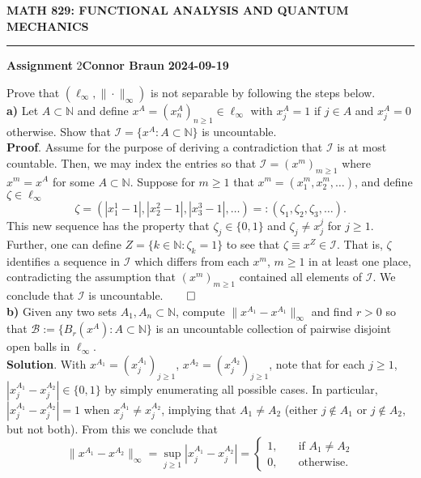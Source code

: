 \documentclass[10pt]{article}
\newcommand{\mbb}[1]{\mathbb{#1}}
\newcommand{\1}[1]{\mathbbm{1}_{#1}}
\newcommand{\mc}[1]{\mathcal{#1}}
\begin{document}
    \begin{center}
        {\bf\large{MATH 829: FUNCTIONAL ANALYSIS AND QUANTUM MECHANICS}}
        \smallskip
        \hrule
        \smallskip
        {\bf Assignment} 2\hfill {\bf Connor Braun} \hfill {\bf 2024-09-19}
    \end{center}
    \vspace{5pt}
     Prove that $(\ell_\infty,\|\cdot\|_\infty)$ is not separable by following the steps below.\\[5pt]
    {\bf a)} Let $A\subset\mbb{N}$ and define $x^A=(x^A_n)_{n\geq 1}\in\ell_\infty$ with $x^A_j=1$ if $j\in A$ and $x^A_j=0$ otherwise. Show that $\mc{I}=\{x^A:A\subset \mbb{N}\}$ is uncountable.\\[5pt]
    {\bf Proof}. Assume for the purpose of deriving a contradiction that $\mc{I}$ is at most countable. Then, we may index the entries so that $\mc{I}=(x^m)_{m\geq 1}$ where $x^m=x^A$ for some $A\subset\mbb{N}$.
    Suppose for $m\geq 1$ that $x^m=(x^m_1,x^m_2,\dots)$, and define $\zeta\in\ell_\infty$
    \[\zeta=(|x^1_1-1|,|x^2_2-1|,|x^3_3-1|,\dots)=:(\zeta_1,\zeta_2,\zeta_3,\dots).\]
    This new sequence has the property that $\zeta_j\in\{0,1\}$ and $\zeta_j\neq x^j_j$ for $j\geq 1$. Further, one can define $Z=\{k\in\mbb{N}:\zeta_k=1\}$
    to see that $\zeta\equiv x^Z\in\mc{I}$. That is, $\zeta$ identifies a sequence in $\mc{I}$ which differs from each $x^m$, $m\geq 1$ in at least one place, contradicting
    the assumption that $(x^m)_{m\geq 1}$ contained all elements of $\mc{I}$. We conclude that $\mc{I}$ is uncountable.\hfill{$\qed$}\\[5pt]
    {\bf b)} Given any two sets $A_1,A_n\subset\mbb{N}$, compute $\|x^{A_1}-x^{A_1}\|_{\infty}$ and find $r>0$ so that $\mc{B}:=\{B_r(x^A):A\subset\mbb{N}\}$
    is an uncountable collection of pairwise disjoint open balls in $\ell_\infty$.\\[5pt]
    {\bf Solution}. With $x^{A_1}=(x^{A_1}_j)_{j\geq 1}$, $x^{A_2}=(x^{A_2}_j)_{j\geq 1}$, note that for each $j\geq 1$, $|x^{A_1}_j-x^{A_2}_j|\in\{0,1\}$ by simply enumerating all
    possible cases. In particular, $|x^{A_1}_j-x^{A_2}_j|=1$ when $x^{A_1}_j\neq x^{A_2}_j$, implying that $A_1\neq A_2$ (either $j\notin A_1$ or $j\notin A_2$, but not both).
    From this we conclude that
    \[\|x^{A_1}-x^{A_2}\|_\infty=\sup_{j\geq1}|x^{A_1}_j-x^{A_2}_j|=\begin{cases}
        1,\quad&\text{if $A_1\neq A_2$}\\
        0,\quad&\text{otherwise.}
    \end{cases}\]
\end{document}
